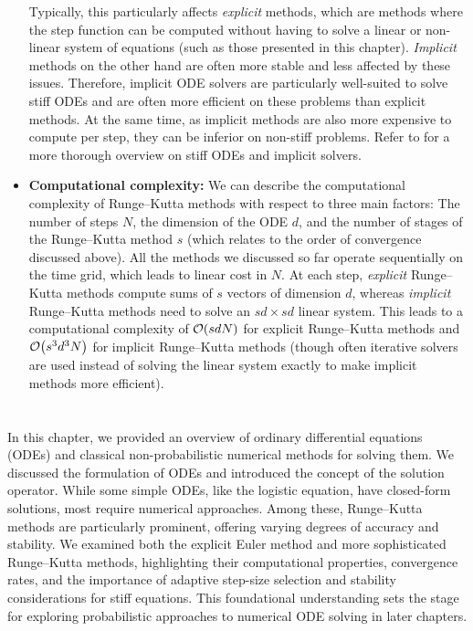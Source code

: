 \documentclass{mimosis}
\begin{document}
\begin{itemize}[left=0pt .. \parindent]
Typically, this particularly affects \emph{explicit} methods, which are methods where the step function can be computed without having to solve a linear or non-linear system of equations (such as those presented in this chapter).
\emph{Implicit} methods on the other hand are often more stable and less affected by these issues.
Therefore, implicit ODE solvers are particularly well-suited to solve stiff ODEs and are often more efficient on these problems than explicit methods.
At the same time, as implicit methods are also more expensive to compute per step, they can be inferior on non-stiff problems.
Refer to \textcite{hairer1987solving} for a more thorough overview on stiff ODEs and implicit solvers.
\item \textbf{Computational complexity:}
We can describe the computational complexity of Runge--Kutta methods with respect to three main factors:
The number of steps \(N\),
the dimension of the ODE \(d\),
and the number of stages of the Runge--Kutta method \(s\) (which relates to the order of convergence discussed above).
All the methods we discussed so far operate sequentially on the time grid, which leads to linear cost in \(N\).
At each step, \emph{explicit} Runge--Kutta methods compute sums of \(s\) vectors of dimension \(d\), whereas
\emph{implicit} Runge--Kutta methods need to solve an \(sd \!\times\! sd\) linear system.
This leads to a computational complexity of \(\order{s d N}\) for explicit Runge--Kutta methods and \(\order{s^3 d^3 N}\) for implicit Runge--Kutta methods
(though often iterative solvers are used instead of solving the linear system exactly to make implicit methods more efficient).
\end{itemize}
\section{\wrapupsec{}}
\label{sec:org5a183e3}
In this chapter, we provided an overview of ordinary differential equations (ODEs) and classical non-probabilistic numerical methods for solving them.
We discussed the formulation of ODEs and introduced the concept of the solution operator.
While some simple ODEs, like the logistic equation, have closed-form solutions, most require numerical approaches.
Among these, Runge--Kutta methods are particularly prominent, offering varying degrees of accuracy and stability.
We examined both the explicit Euler method and more sophisticated Runge--Kutta methods, highlighting their computational properties, convergence rates, and the importance of adaptive step-size selection and stability considerations for stiff equations.
This foundational understanding sets the stage for exploring probabilistic approaches to numerical ODE solving in later chapters.
\end{document}
